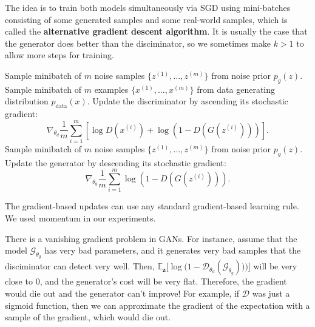 \documentclass{article}
\begin{document}
  \begin{algo}
    The idea is to train both models simultaneously via SGD using mini-batches consisting of some generated samples and some real-world samples, which is called the \textbf{alternative gradient descent algorithm}. It is usually the case that the generator does better than the disciminator, so we sometimes make $k > 1$ to allow more steps for training. 
    \begin{algorithm}[H]
      \caption{Minibatch stochastic gradient descent training of generative adversarial nets. The number of steps to apply to the discriminator, $k$, is a hyperparameter. We used $k = 1$, the least expensive option, in our experiments.}
      \label{alg:alt_gd}
      \begin{algorithmic}[1] 
                \State Sample minibatch of $m$ noise samples $\{z^{(1)}, \ldots, z^{(m)}\}$ from noise prior $p_g(z)$.
                \State Sample minibatch of $m$ examples $\{x^{(1)}, \ldots, x^{(m)}\}$ from data generating distribution $p_{\text{data}}(x)$.
                \State Update the discriminator by ascending its stochastic gradient:
                \begin{equation}
                  \nabla_{\theta_d} \frac{1}{m} \sum_{i=1}^m \left[\log D\left(x^{(i)}\right) + \log\left(1-D\left(G\left(z^{(i)}\right)\right)\right)\right].
                \end{equation}
            \EndFor
            \State Sample minibatch of $m$ noise samples $\{z^{(1)}, \ldots, z^{(m)}\}$ from noise prior $p_g(z)$.
            \State Update the generator by descending its stochastic gradient:
            \begin{equation}
              \nabla_{\theta_g} \frac{1}{m} \sum_{i=1}^m \log\left(1-D\left(G\left(z^{(i)}\right)\right)\right).
            \end{equation}
        \EndFor
      \end{algorithmic}
    \end{algorithm}
    The gradient-based updates can use any standard gradient-based learning rule. We used momentum in our experiments.
  \end{algo} 

  There is a vanishing gradient problem in GANs. For instance, assume that the model $\mathcal{G}_{\theta_g}$ has very bad parameters, and it generates very bad samples that the disciminator can detect very well. Then, $\mathbb{E}_{\mathbf{z}} \big[ \log \big( 1 - \mathcal{D}_{\theta_d} (\mathcal{G}_{\theta_g}))\big) \big]$ will be very close to $0$, and the generator's cost will be very flat. Therefore, the gradient would die out and the generator can't improve! For example, if $\mathcal{D}$ was just a sigmoid function, then we can approximate the gradient of the expectation with a sample of the gradient, which would die out. 
\end{document}

